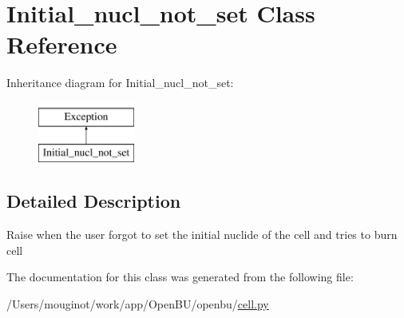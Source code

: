 \hypertarget{classopenbu_1_1cell_1_1_initial__nucl__not__set}{}\section{Initial\+\_\+nucl\+\_\+not\+\_\+set Class Reference}
\label{classopenbu_1_1cell_1_1_initial__nucl__not__set}
Inheritance diagram for Initial\+\_\+nucl\+\_\+not\+\_\+set\+:\begin{figure}[H]
\begin{center}
\leavevmode
\includegraphics[height=2.000000cm]{classopenbu_1_1cell_1_1_initial__nucl__not__set}
\end{center}
\end{figure}


\subsection{Detailed Description}
\begin{DoxyVerb}Raise when the user forgot to set the initial nuclide of the cell and tries to burn cell\end{DoxyVerb}
 

The documentation for this class was generated from the following file\+:\begin{DoxyCompactItemize}
\item 
/\+Users/mouginot/work/app/\+Open\+B\+U/openbu/\mbox{\hyperlink{cell_8py}{cell.\+py}}\end{DoxyCompactItemize}
